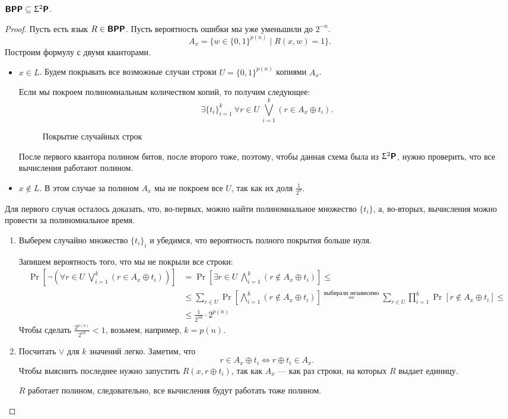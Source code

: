 \begin{thm}
	$ \textmd{\textbf{\textsf{BPP}}} \subseteq \Upsigma^2\textmd{\textbf{\textsf{P}}}$.
\end{thm}
\begin{proof}
	Пусть есть язык $ R \in \textmd{\textbf{\textsf{BPP}}}$. Пусть вероятность ошибки мы уже уменьшили до $ 2^{-n}$.
	\[
		A_x = \{w \in \{0, 1\}^{p(n)} \mid R(x, w) = 1\}
	.\]
	Построим формулу с двумя кванторами.

	\begin{itemize}
		\item $ x \in L$.
			Будем покрывать все возможные случаи строки $ U = \{0, 1\}^{p(n)}$ копиями $ A_x$.

			Если мы покроем полиномиальным количеством копий, то получим следующее:
			\[
				\exists \{t_{i}\}_{i=1}^{k} ~ \forall r \in U ~ \bigvee_{i=1}^{k} (r \in A_x \oplus t_i)
			.\]
			\begin{figure}[ht]
				\centering
				\caption{Покрытие случайных строк}
				\label{fig:copy-ax}
			\end{figure}
			После первого квантора полином битов, после второго тоже, поэтому, чтобы данная схема была из $ \Upsigma^2\textmd{\textbf{\textsf{P}}}$, нужно проверить, что все вычисления работают полином.
		\item $ x \notin L$.
			В этом случае за полином $ A_x$ мы не покроем все $ U$, так как их доля $ \frac{1}{2^{n}}$.
	\end{itemize}
	Для первого случая осталось доказать, что, во-первых, можно найти полиномиальное множество $ \{t_i\}$, а, во-вторых, вычисления можно провести за полиномиальное время.
	\begin{enumerate}
	    \item 
			Выберем случайно множество $ \{t_i\}_{i}$ и убедимся, что вероятность полного покрытия больше нуля.

			Запишем вероятность того, что мы не покрыли все строки:
			\[
			\begin{aligned}
				\Pr \left[ \neg \left( \forall r \in U ~\bigvee_{i=1}^{k}(r \in A_x \oplus t_i) \right)  \right] &= \Pr \left[ \exists r \in U ~ \bigwedge_{i=1}^{k}\left( r \notin A_x \oplus t_i \right)  \right] \le \\
																												 & \le \sum_{r \in U}^{} \Pr \left[ \bigwedge_{i=1}^{k} (r \notin A_x \oplus t_i) \right]  \stackrel{\text{выбирали независимо}}{=} \sum_{r \in U}^{} \prod_{i=1}^{k} \Pr [r \notin A_x \oplus t_i] \le \\
																												 & \le \frac{1}{2^{nk}}\cdot 2 ^{p(n)}
			\end{aligned}
			\]
			Чтобы сделать $ \frac{2^{p(n)}}{2^{nk}} < 1$, возьмем, например, $k= p(n)$.
		\item Посчитать $ \vee$ для $ k$ значений легко. 
			Заметим, что 
			\[
			r \in A_x \oplus t_i \Longleftrightarrow r \oplus t_i \in A_x
			.\] 
			Чтобы выяснить последнее нужно запустить $ R(x, r \oplus t_i)$, так как $ A_x$ --- как раз строки, на которых $ R$ выдает  единицу.

			$ R$ работает полином, следовательно, все вычисления будут работать тоже полином.
	\end{enumerate} 
\end{proof}
